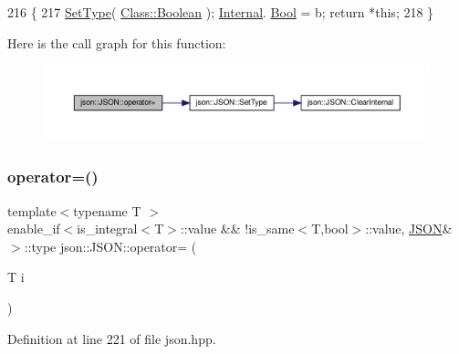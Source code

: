 \begin{DoxyCode}
216                                                                                  \{
217                 \mbox{\hyperlink{classjson_1_1_j_s_o_n_a668500208950e48394fc8bfe7c320205}{SetType}}( \mbox{\hyperlink{classjson_1_1_j_s_o_n_a762f55df6d407c1af61607ed516ffe07a27226c864bac7454a8504f8edb15d95b}{Class::Boolean}} ); \mbox{\hyperlink{classjson_1_1_j_s_o_n_a1e2a064794c3d55c8bb8887fc5734947}{Internal}}.
      \mbox{\hyperlink{unionjson_1_1_j_s_o_n_1_1_backing_data_a0659fafaedb7de535ae3e79e4ff4688c}{Bool}} = b; \textcolor{keywordflow}{return} *\textcolor{keyword}{this};
218             \}
\end{DoxyCode}
Here is the call graph for this function\+:
\nopagebreak
\begin{figure}[H]
\begin{center}
\leavevmode
\includegraphics[width=350pt]{classjson_1_1_j_s_o_n_a1ee7a8f339bd04d78a4db4aa09cc4e53_cgraph}
\end{center}
\end{figure}
\mbox{\label{classjson_1_1_j_s_o_n_aed9846560a9b7c25b26f684e8d9f32f6}} 
\subsubsection{\texorpdfstring{operator=()}{operator=()}\hspace{0.1cm}{\footnotesize\ttfamily [4/6]}}
{\footnotesize\ttfamily template$<$typename T $>$ \\
enable\+\_\+if$<$is\+\_\+integral$<$T$>$\+::value \&\& !is\+\_\+same$<$T,bool$>$\+::value, \mbox{\hyperlink{classjson_1_1_j_s_o_n}{J\+S\+ON}}\&$>$\+::type json\+::\+J\+S\+O\+N\+::operator= (\begin{DoxyParamCaption}\item[{T}]{i }\end{DoxyParamCaption})\hspace{0.3cm}{\ttfamily [inline]}}



Definition at line 221 of file json.\+hpp.



